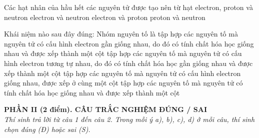 \documentclass[11pt,a4paper]{article}
\begin{document}
\begin{ex}
Các hạt nhân của hầu hết các nguyên tử được tạo nên từ hạt
\choice
{electron, proton và neutron}
{electron và neutron}
{electron và proton}
{\True proton và neutron}

\end{ex}
\begin{ex}
Khái niệm nào sau đây đúng: Nhóm nguyên tố là
\choice
{tập hợp các nguyên tố mà nguyên tử có cấu hình electron gần giống nhau, do đó có tính chất hóa học giống nhau và được xếp thành một cột}
{\True tập hợp các nguyên tố mà nguyên tử có cấu hình electron tương tự nhau, do đó có tính chất hóa học gần giống nhau và được xếp thành một cột}
{tập hợp các nguyên tố mà nguyên tử có cấu hình electron giống nhau, được xếp ở cùng một cột}
{tập hợp các nguyên tố mà nguyên tử có tính chất hóa học giống nhau và được xếp thành một cột}

\end{ex}
\vspace{4pt}
\noindent
{\color{mainGreen}\textbf{\large PHẦN II (2 điểm). CÂU TRẮC NGHIỆM ĐÚNG / SAI}}\\
\textit{\small Thí sinh trả lời từ câu 1 đến câu 2. Trong mỗi ý a), b), c), d) ở mỗi câu, thí sinh chọn đúng (Đ) hoặc sai (S).}
\vspace{2pt}
\end{document}
